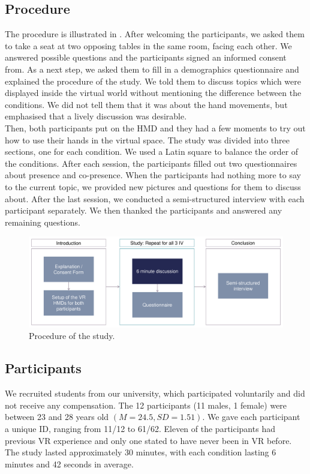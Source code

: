 \documentclass[english,runningheads,a4paper]{llncs}[2018/03/10]
\begin{document}
\subsection{Procedure}
The procedure is illustrated in .
After welcoming the participants, we asked them to take a seat at two opposing tables in the same room, facing each other. 
We answered possible questions and the participants signed an informed consent from. 
As a next step, we asked them to fill in a demographics questionnaire and explained the procedure of the study. 
We told them to discuss topics which were displayed inside the virtual world without mentioning the difference between the conditions. 
We did not tell them that it was about the hand movements, but emphasised that a lively discussion was desirable. \\ \linebreak
Then, both participants put on the HMD and they had a few moments to try out how to use their hands in the virtual space. 
The study was divided into three sections, one for each condition. 
We used a Latin square to balance the order of the conditions. 
After each session, the participants filled out two questionnaires about presence and co-presence. 
When the participants had nothing more to say to the current topic, we provided new pictures and questions for them to discuss about. 
After the last session, we conducted a semi-structured interview with each participant separately. 
We then thanked the participants and answered any remaining questions. 

\begin{figure}[t]
    \centering
    \includegraphics[width=\linewidth]{figures/procedure.pdf}
    \caption{Procedure of the study.}
    \label{fig:procedure}
\end{figure}


\subsection{Participants}
We recruited students from our university, which participated voluntarily and did not receive any compensation. 
The 12 participants (11 males, 1 female) were between 23 and 28 years old $(M = 24.5, SD = 1.51)$. We gave each participant a unique ID, ranging from 11/12 to 61/62.
Eleven of the participants had previous VR experience and only one stated to have never been in VR before.
The study lasted approximately 30 minutes, with each condition lasting 6 minutes and 42 seconds in average.
\end{document}
